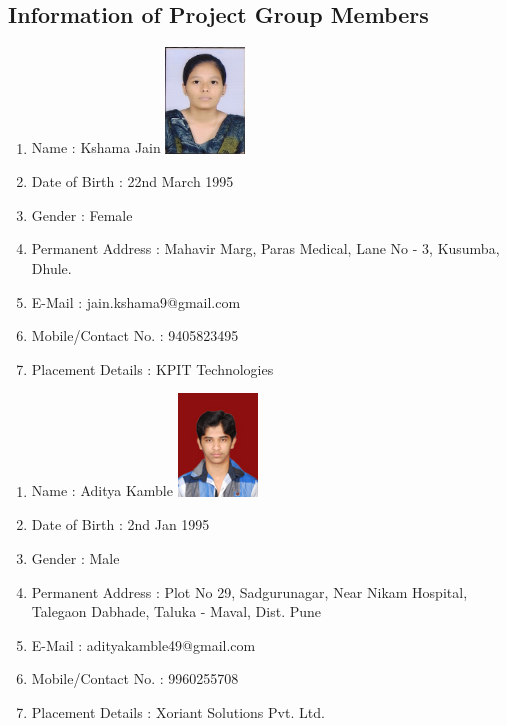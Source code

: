 \documentclass[oneside,a4paper,12pt]{report}
\begin{document}
{\begin{appendices}
\chapter{Information of Project Group Members}


\begin{enumerate}
	\item Name : Kshama Jain  \hspace{90 mm}
	\includegraphics[width=60pt]{kshama-jain.jpg}
	\item Date of Birth : 22nd March 1995
	\item Gender : Female
	\item Permanent Address : Mahavir Marg, Paras Medical, Lane No - 3, Kusumba, Dhule.  
	\item E-Mail : jain.kshama9@gmail.com
	\item Mobile/Contact No. : 9405823495
	\item Placement Details : KPIT Technologies
\end{enumerate}
\pagebreak

\begin{enumerate}
	\item Name : Aditya Kamble  \hspace{90 mm}
	\includegraphics[width=60pt]{aditya-kamble.jpg}
	\item Date of Birth : 2nd Jan 1995
	\item Gender : Male
	\item Permanent Address : Plot No 29, Sadgurunagar, Near Nikam Hospital, Talegaon Dabhade, Taluka - Maval, Dist. Pune
	\item E-Mail : adityakamble49@gmail.com
	\item Mobile/Contact No. : 9960255708
	\item Placement Details : Xoriant Solutions Pvt. Ltd.
\end{enumerate}
\pagebreak


\end{appendices}}
\end{document}
